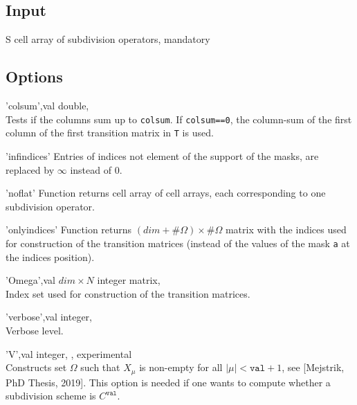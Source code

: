\subsection*{Input}
\begin{param}
\item[S] cell array of subdivision operators, mandatory
\end{param}

\subsection*{Options}
\begin{param}
\item['colsum',val]  double, \\
Tests if the columns sum up to \texttt{colsum}. If \texttt{colsum==0}, the column-sum of the first column of the first transition matrix in \texttt{T} is used.

\item['infindices']        Entries of indices not element of the support of the masks, are replaced by $\infty$ instead of $0$.

\item['noflat']            Function returns cell array of cell arrays, each corresponding to one subdivision operator.

\item['onlyindices'] Function returns $(dim+\#\Omega) \times \#\Omega$ matrix with the indices used for construction of the transition matrices (instead of the values of the mask \texttt{a} at the indices position).

\item['Omega',val] $dim\times N$ integer matrix, \\
Index set used for construction of the transition matrices.

\item['verbose',val] integer, \\Verbose level.

\item['V',val] integer, , {\color{red}experimental}\\ Constructs set $\Omega$ such that $X_\mu$ is non-empty for all $|\mu|<\texttt{val}+1$, see [Mejstrik, PhD Thesis, 2019]. This option is needed if one wants to compute whether a subdivision scheme is $C^\texttt{val}$.
\end{param}

